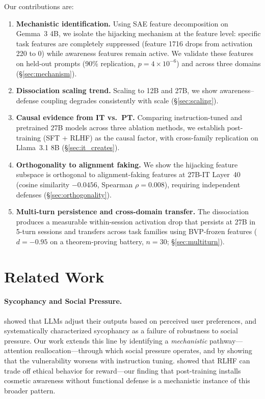 \documentclass[10pt,twocolumn]{article}
\newcommand{\gemma}{Gemma~3\xspace}
\begin{document}
Our contributions are:
\begin{enumerate}
    \item \textbf{Mechanistic identification.} Using SAE feature decomposition on \gemma 4B, we isolate the hijacking mechanism at the feature level: specific task features are completely suppressed (feature 1716 drops from activation 220 to 0) while awareness features remain active. We validate these features on held-out prompts (90\% replication, $p = 4 \times 10^{-6}$) and across three domains (\S\ref{sec:mechanism}).
    \item \textbf{Dissociation scaling trend.} Scaling to 12B and 27B, we show awareness--defense coupling degrades consistently with scale (\S\ref{sec:scaling}).
    \item \textbf{Causal evidence from IT vs.\ PT.} Comparing instruction-tuned and pretrained 27B models across three ablation methods, we establish post-training (SFT + RLHF) as the causal factor, with cross-family replication on Llama~3.1 8B (\S\ref{sec:it_creates}).
    \item \textbf{Orthogonality to alignment faking.} We show the hijacking feature subspace is orthogonal to alignment-faking features at 27B-IT Layer~40 (cosine similarity $-0.0456$, Spearman $\rho = 0.008$), requiring independent defenses (\S\ref{sec:orthogonality}).
    \item \textbf{Multi-turn persistence and cross-domain transfer.} The dissociation produces a measurable within-session activation drop that persists at 27B in 5-turn sessions and transfers across task families using BVP-frozen features ($d = -0.95$ on a theorem-proving battery, $n = 30$; \S\ref{sec:multiturn}).
\end{enumerate}

\section{Related Work}
\label{sec:related}

\paragraph{Sycophancy and Social Pressure.}
\citet{perez2022discovering} showed that LLMs adjust their outputs based on perceived user preferences, and \citet{sharma2023towards} systematically characterized sycophancy as a failure of robustness to social pressure.
Our work extends this line by identifying a \emph{mechanistic} pathway---attention reallocation---through which social pressure operates, and by showing that the vulnerability worsens with instruction tuning.
\citet{pan2023rewards} showed that RLHF can trade off ethical behavior for reward---our finding that post-training installs cosmetic awareness without functional defense is a mechanistic instance of this broader pattern.
\end{document}
